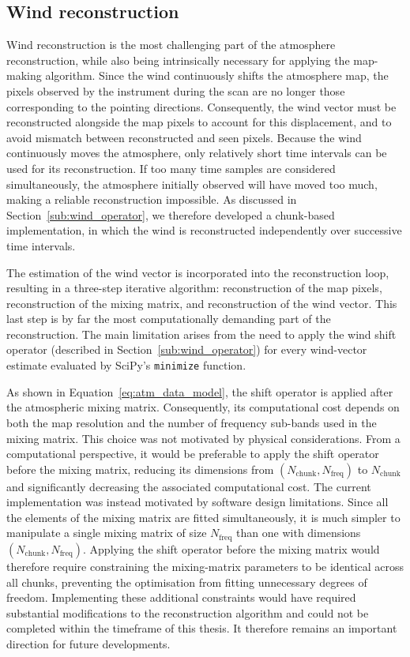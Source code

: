 \documentclass[../../thesis.tex]{subfiles}
\begin{document}
\subsection{Wind reconstruction} \label{sub:wind}

Wind reconstruction is the most challenging part of the atmosphere reconstruction, while also being intrinsically necessary for applying the map-making algorithm. Since the wind continuously shifts the atmosphere map, the pixels observed by the instrument during the scan are no longer those corresponding to the pointing directions. Consequently, the wind vector must be reconstructed alongside the map pixels to account for this displacement, and to avoid mismatch between reconstructed and seen pixels.
Because the wind continuously moves the atmosphere, only relatively short time intervals can be used for its reconstruction. If too many time samples are considered simultaneously, the atmosphere initially observed will have moved too much, making a reliable reconstruction impossible. As discussed in Section~\ref{sub:wind_operator}, we therefore developed a chunk-based implementation, in which the wind is reconstructed independently over successive time intervals.

The estimation of the wind vector is incorporated into the reconstruction loop, resulting in a three-step iterative algorithm: reconstruction of the map pixels, reconstruction of the mixing matrix, and reconstruction of the wind vector. This last step is by far the most computationally demanding part of the reconstruction. The main limitation arises from the need to apply the wind shift operator (described in Section~\ref{sub:wind_operator}) for every wind-vector estimate evaluated by SciPy's \texttt{minimize} function.

As shown in Equation~\ref{eq:atm_data_model}, the shift operator is applied after the atmospheric mixing matrix. Consequently, its computational cost depends on both the map resolution and the number of frequency sub-bands used in the mixing matrix. This choice was not motivated by physical considerations. From a computational perspective, it would be preferable to apply the shift operator before the mixing matrix, reducing its dimensions from $\left(N_\text{chunk}, N_\text{freq}\right)$ to $N_\text{chunk}$ and significantly decreasing the associated computational cost.
The current implementation was instead motivated by software design limitations. Since all the elements of the mixing matrix are fitted simultaneously, it is much simpler to manipulate a single mixing matrix of size $N_\text{freq}$ than one with dimensions $\left(N_\text{chunk}, N_\text{freq}\right)$. Applying the shift operator before the mixing matrix would therefore require constraining the mixing-matrix parameters to be identical across all chunks, preventing the optimisation from fitting unnecessary degrees of freedom. Implementing these additional constraints would have required substantial modifications to the reconstruction algorithm and could not be completed within the timeframe of this thesis. It therefore remains an important direction for future developments.
\end{document}
